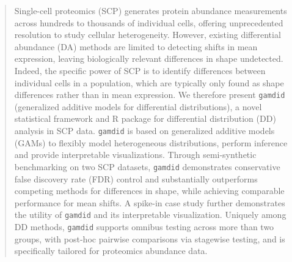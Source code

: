 \begin{abstract}

Single-cell proteomics (SCP) generates protein abundance measurements across
hundreds to thousands of individual cells, offering unprecedented resolution to
study cellular heterogeneity. However, existing differential abundance (DA)
methods are limited to detecting shifts in mean expression, leaving biologically
relevant differences in shape undetected. Indeed, the specific power of SCP is
to identify differences between individual cells in a population, which are
typically only found as shape differences rather than in mean expression.
We therefore present \texttt{gamdid} (generalized additive
models for differential distributions), a novel statistical framework and R
package for differential distribution (DD) analysis in SCP data. \texttt{gamdid}
is based on generalized additive models (GAMs) to flexibly model heterogeneous
distributions, perform inference and provide interpretable visualizations.
Through semi-synthetic benchmarking on two SCP datasets, \texttt{gamdid}
demonstrates conservative false discovery rate (FDR) control
and substantially outperforms competing methods for differences in shape,
while achieving comparable performance for mean shifts. A spike-in case study
further demonstrates the utility of \texttt{gamdid} and its interpretable
visualization. Uniquely among DD methods, \texttt{gamdid} supports omnibus
testing across more than two groups, with post-hoc pairwise comparisons via
stagewise testing, and is specifically tailored for proteomics abundance data.

\end{abstract}
